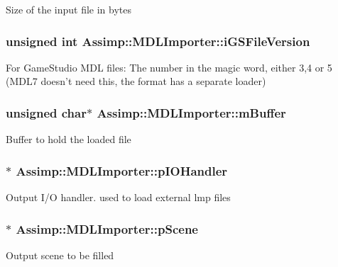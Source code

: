 Size of the input file in bytes \hypertarget{class_assimp_1_1_m_d_l_importer_af4fd7e31090f7e9cebaf212af72ee801}{
\subsubsection[{i\+G\+S\+File\+Version}]{\setlength{\rightskip}{0pt plus 5cm}unsigned int Assimp\+::\+M\+D\+L\+Importer\+::i\+G\+S\+File\+Version\hspace{0.3cm}{\ttfamily [protected]}}}\label{class_assimp_1_1_m_d_l_importer_af4fd7e31090f7e9cebaf212af72ee801}
For Game\+Studio M\+D\+L files\+: The number in the magic word, either 3,4 or 5 (M\+D\+L7 doesn't need this, the format has a separate loader) \hypertarget{class_assimp_1_1_m_d_l_importer_ac33a21b57e203a8d12fa632460191f21}{
\subsubsection[{m\+Buffer}]{\setlength{\rightskip}{0pt plus 5cm}unsigned char$\ast$ Assimp\+::\+M\+D\+L\+Importer\+::m\+Buffer\hspace{0.3cm}{\ttfamily [protected]}}}\label{class_assimp_1_1_m_d_l_importer_ac33a21b57e203a8d12fa632460191f21}
Buffer to hold the loaded file \hypertarget{class_assimp_1_1_m_d_l_importer_a5799905b6ba533b0f066684b859bc3d5}{
\subsubsection[{p\+I\+O\+Handler}]{$\ast$ Assimp\+::\+M\+D\+L\+Importer\+::p\+I\+O\+Handler\hspace{0.3cm}{\ttfamily [protected]}}}\label{class_assimp_1_1_m_d_l_importer_a5799905b6ba533b0f066684b859bc3d5}
Output I/\+O handler. used to load external lmp files \hypertarget{class_assimp_1_1_m_d_l_importer_a7c9f90a45d7a42bfc37d53bd8d7452e8}{
\subsubsection[{p\+Scene}]{$\ast$ Assimp\+::\+M\+D\+L\+Importer\+::p\+Scene\hspace{0.3cm}{\ttfamily [protected]}}}\label{class_assimp_1_1_m_d_l_importer_a7c9f90a45d7a42bfc37d53bd8d7452e8}
Output scene to be filled 

